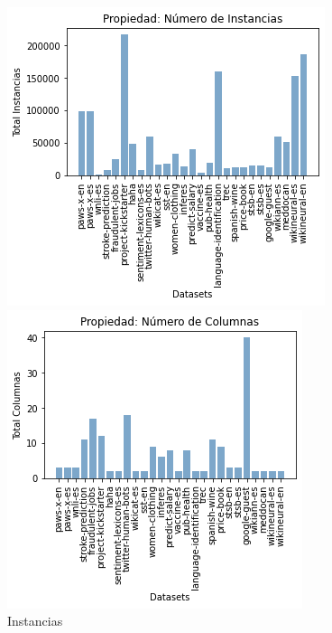 \begin{figure}
  \begin{minipage}[b]{0.31\textwidth}
    \centering
    \includegraphics[width=\textwidth]{Graphics/results/instances.png}
      \caption{Instancias}
      \label{fig:instances}
    \end{minipage} 
\hspace{0.01cm}
  \begin{minipage}[b]{0.31\textwidth}
    \centering
      \includegraphics[width=\textwidth]{Graphics/results/columns.png}

\end{minipage}
\end{figure}

